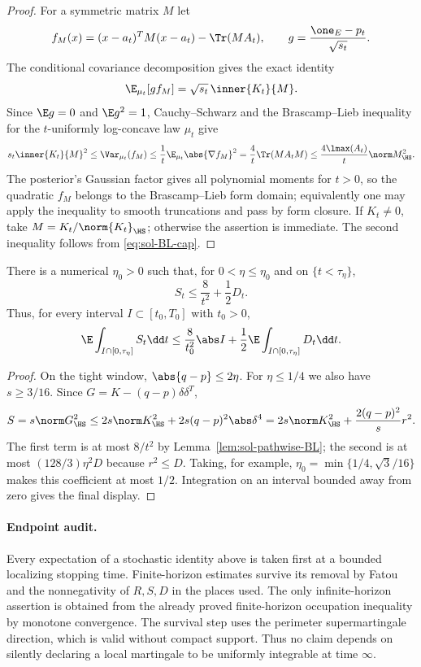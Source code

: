 \documentclass[../main.tex]{subfiles}
\begin{document}
\begin{proof}
For a symmetric matrix $M$ let
\[
 f_M(x)=(x-a_t)^TM(x-a_t)-\Tr(MA_t),
 \qquad g=\frac{\one_E-p_t}{\sqrt{s_t}}.
\]
The conditional covariance decomposition gives the exact identity
\begin{equation}\label{eq:sol-color-quadratic}
 \E_{\mu_t}[g f_M]=\sqrt{s_t}\,\inner{K_t}{M}.
\end{equation}
Since $\E g=0$ and $\E g^2=1$, Cauchy--Schwarz and the Brascamp--Lieb inequality for the
$t$-uniformly log-concave law $\mu_t$ give
\[
 s_t\inner{K_t}{M}^2
 \le\Var_{\mu_t}(f_M)
 \le\frac1t\E_{\mu_t}\abs{\nabla f_M}^2
 =\frac4t\Tr(MA_tM)
 \le\frac{4\lmax(A_t)}t\norm M_\HS^2.
\]
The posterior's Gaussian factor gives all polynomial moments for $t>0$, so the quadratic
$f_M$ belongs to the Brascamp--Lieb form domain; equivalently one may apply the inequality to
smooth truncations and pass by form closure.
If $K_t\ne0$, take $M=K_t/\norm{K_t}_\HS$; otherwise the assertion is immediate.
The second inequality follows from \eqref{eq:sol-BL-cap}.
\end{proof}

\begin{corollary}[= Corollary~\ref{cor:away-from-zero}]
\label{cor:sol-away-from-zero}
There is a numerical $\eta_0>0$ such that, for
$0<\eta\le\eta_0$ and on $\{t<\tau_\eta\}$,
\[
 S_t\le\frac8{t^2}+\frac12D_t.
\]
Thus, for every interval $I\subset[t_0,T_0]$ with $t_0>0$,
\[
 \E\int_{I\cap[0,\tau_\eta]}S_t\dd t
 \le\frac8{t_0^2}\abs I+\frac12
 \E\int_{I\cap[0,\tau_\eta]}D_t\dd t.
\]
\end{corollary}

\begin{proof}
On the tight window, $\abs{q-p}\le2\eta$.  For $\eta\le1/4$ we also have
$s\ge3/16$.  Since $G=K-(q-p)\delta\delta^T$,
\[
 S=s\norm G_\HS^2
 \le2s\norm K_\HS^2+2s(q-p)^2\abs\delta^4
 =2s\norm K_\HS^2+\frac{2(q-p)^2}{s}r^2.
\]
The first term is at most $8/t^2$ by Lemma~\ref{lem:sol-pathwise-BL}; the second is at most
$(128/3)\eta^2D$ because $r^2\le D$.  Taking, for example,
$\eta_0=\min\{1/4,\sqrt3/16\}$ makes this coefficient at most $1/2$.  Integration on an
interval bounded away from zero gives the final display.
\end{proof}

\paragraph{Endpoint audit.}
Every expectation of a stochastic identity above is taken first at a bounded localizing
stopping time.  Finite-horizon estimates survive its removal by Fatou and the nonnegativity of
$R,S,D$ in the places used.  The only infinite-horizon assertion is obtained from the already
proved finite-horizon occupation inequality by monotone convergence.  The survival step uses
the perimeter supermartingale direction, which is valid without compact support.  Thus no
claim depends on silently declaring a local martingale to be uniformly integrable at time
$\infty$.
\end{document}
